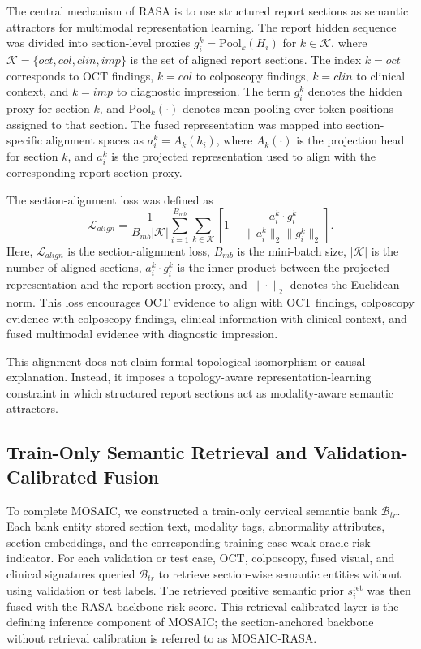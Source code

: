 \documentclass[11pt, a4paper]{article}
\theoremstyle{plain}
\theoremstyle{definition}
\begin{document}
The central mechanism of RASA is to use structured report sections as semantic attractors for multimodal representation learning. The report hidden sequence was divided into section-level proxies \(g_i^k=\mathrm{Pool}_{k}(H_i)\) for \(k\in\mathcal{K}\), where \(\mathcal{K}=\{oct,col,clin,imp\}\) is the set of aligned report sections. The index \(k=oct\) corresponds to OCT findings, \(k=col\) to colposcopy findings, \(k=clin\) to clinical context, and \(k=imp\) to diagnostic impression. The term \(g_i^k\) denotes the hidden proxy for section \(k\), and \(\mathrm{Pool}_{k}(\cdot)\) denotes mean pooling over token positions assigned to that section. The fused representation was mapped into section-specific alignment spaces as \(a_i^{k}=A_k(h_i)\), where \(A_k(\cdot)\) is the projection head for section \(k\), and \(a_i^k\) is the projected representation used to align with the corresponding report-section proxy.

The section-alignment loss was defined as
\begin{equation}
\mathcal{L}_{align}
=
\frac{1}{B_{mb}|\mathcal{K}|}
\sum_{i=1}^{B_{mb}}
\sum_{k\in\mathcal{K}}
\left[
1-
\frac{a_i^{k}\cdot g_i^{k}}
{\|a_i^{k}\|_2\|g_i^{k}\|_2}
\right].
\end{equation}
Here, \(\mathcal{L}_{align}\) is the section-alignment loss, \(B_{mb}\) is the mini-batch size, \(|\mathcal{K}|\) is the number of aligned sections, \(a_i^k\cdot g_i^k\) is the inner product between the projected representation and the report-section proxy, and \(\|\cdot\|_2\) denotes the Euclidean norm. This loss encourages OCT evidence to align with OCT findings, colposcopy evidence with colposcopy findings, clinical information with clinical context, and fused multimodal evidence with diagnostic impression.

This alignment does not claim formal topological isomorphism or causal explanation. Instead, it imposes a topology-aware representation-learning constraint in which structured report sections act as modality-aware semantic attractors.

\subsection{Train-Only Semantic Retrieval and Validation-Calibrated Fusion}
\label{subsec:methods_retrieval_fusion}

To complete MOSAIC, we constructed a train-only cervical semantic bank \(\mathcal{B}_{tr}\). Each bank entity stored section text, modality tags, abnormality attributes, section embeddings, and the corresponding training-case weak-oracle risk indicator. For each validation or test case, OCT, colposcopy, fused visual, and clinical signatures queried \(\mathcal{B}_{tr}\) to retrieve section-wise semantic entities without using validation or test labels. The retrieved positive semantic prior \(s_i^{\mathrm{ret}}\) was then fused with the RASA backbone risk score. This retrieval-calibrated layer is the defining inference component of MOSAIC; the section-anchored backbone without retrieval calibration is referred to as MOSAIC-RASA.
\end{document}
